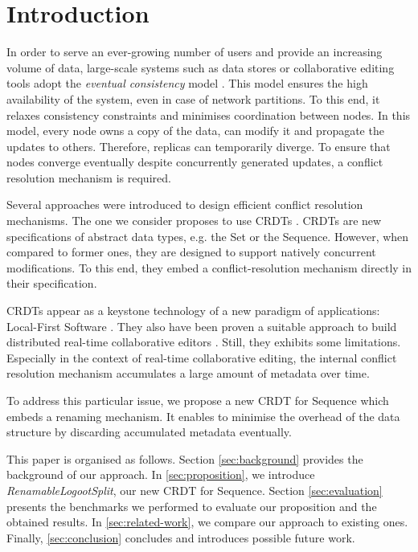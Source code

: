\documentclass[sigplan,10pt,authorversion]{acmart}
\begin{document}

\maketitle

\section{Introduction}

In order to serve an ever-growing number of users and provide an increasing volume of data, large-scale systems such as data stores or collaborative editing tools adopt the \emph{eventual consistency} model \cite{10.1145/224057.224070}.
This model ensures the high availability of the system, even in case of network partitions.
To this end, it relaxes consistency constraints and minimises coordination between nodes.
In this model, every node owns a copy of the data, can modify it and propagate the updates to others.
Therefore, replicas can temporarily diverge.
To ensure that nodes converge eventually despite concurrently generated updates, a conflict resolution mechanism is required.

Several approaches were introduced to design efficient conflict resolution mechanisms.
The one we consider proposes to use \acfp{CRDT} \cite{shapiro_2011_crdt}.
\acp{CRDT} are new specifications of abstract data types, e.g. the Set or the Sequence.
However, when compared to former ones, they are designed to support natively concurrent modifications.
To this end, they embed a conflict-resolution mechanism directly in their specification.

\acp{CRDT} appear as a keystone technology of a new paradigm of applications: Local-First Software \cite{10.1145/3359591.3359737}.
They also have been proven a suitable approach to build distributed real-time collaborative editors \cite{doi:10.1002/cpe.4108}.
Still, they exhibits some limitations.
Especially in the context of real-time collaborative editing, the internal conflict resolution mechanism accumulates a large amount of metadata over time.

To address this particular issue, we propose a new \ac{CRDT} for Sequence which embeds a renaming mechanism.
It enables to minimise the overhead of the data structure by discarding accumulated metadata eventually.

This paper is organised as follows.
Section \ref{sec:background} provides the background of our approach.
In \autoref{sec:proposition}, we introduce \emph{RenamableLogootSplit}, our new \ac{CRDT} for Sequence.
Section \ref{sec:evaluation} presents the benchmarks we performed to evaluate our proposition and the obtained results.
In \autoref{sec:related-work}, we compare our approach to existing ones.
Finally, \autoref{sec:conclusion} concludes and introduces possible future work.
\end{document}
